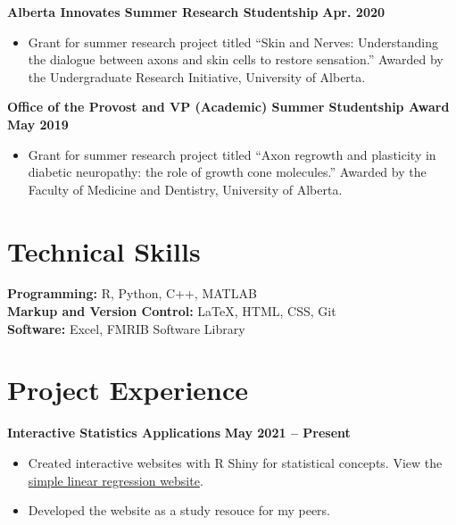\documentclass{article}
\begin{document}
\textbf{Alberta Innovates Summer Research Studentship} \hfill \textbf{Apr. 2020}
\begin{itemize}
    \item Grant for summer research project titled ``Skin and Nerves: Understanding the dialogue between axons and skin cells to restore sensation.'' Awarded by the Undergraduate Research Initiative, University of Alberta.
\end{itemize}
\textbf{Office of the Provost and VP (Academic) Summer Studentship Award} \hfill \textbf{May 2019}
    \begin{itemize}
        \item Grant for summer research project titled ``Axon regrowth and plasticity in diabetic neuropathy: the role of growth cone molecules.'' Awarded by the Faculty of Medicine and Dentistry, University of Alberta.
    \end{itemize}


\section*{\textcolor{my_colour}{Technical Skills}}
\vspace{-.25em} \hrulefill \vspace{.75em}

\textbf{Programming:} R, Python, C++, MATLAB \\
\textbf{Markup and Version Control:} \LaTeX, HTML, CSS, Git \\
\textbf{Software:} Excel, FMRIB Software Library


\section*{\textcolor{my_colour}{Project Experience}}
\vspace{-.25em} \hrulefill \vspace{.75em}

\textbf{Interactive Statistics Applications} \hfill \textbf{May 2021 -- Present}
\begin{itemize}
    \item Created interactive websites with R Shiny for statistical concepts. View the \href{https://intro-stats.shinyapps.io/slreg/}{simple linear regression website}.
    \item Developed the website as a study resouce for my peers.
\end{itemize}
\end{document}
